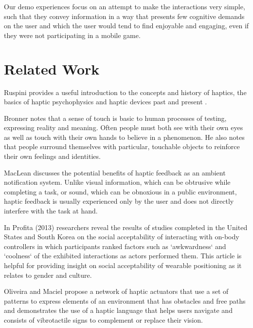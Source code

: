 \documentclass{chi-ext}
\begin{document}
Our demo experiences focus on an attempt to make the interactions very simple, such that they convey information in a way that presents few cognitive demands on the user and which the user would tend to find enjoyable and engaging, even if they were not participating in a mobile game. 

\section{Related Work}

Ruspini provides a useful introduction to the concepts and history of haptics, the basics of haptic psychophysics and haptic devices past and present \cite{ruspini1999haptics}.

Bronner notes that a sense of touch is basic to human processes of testing, expressing reality and meaning. Often people must both see with their own eyes as well as touch with their own hands to believe in a phenomenon\cite{bronner1982haptic}. He also notes that people surround themselves with particular, touchable objects to reinforce their own feelings and identities. 

MacLean \cite{maclean2009putting} discusses the potential benefits of haptic feedback as an ambient notification system. Unlike visual information, which can be obtrusive while completing a task, or sound, which can be obnoxious in a public environment, haptic feedback is usually experienced only by the user and does not directly interfere with the task at hand. 

In Profita (2013) \cite{profita2013don} researchers reveal the results of studies completed in the United States and South Korea on the social acceptability of interacting with on-body controllers in which participants  ranked factors such as `awkwardness` and `coolness` of the exhibited interactions as actors performed them. This article is helpful for providing insight on social acceptability of wearable positioning as it relates to gender and culture.

Oliveira and Maciel propose a network of haptic actuators that use a set of patterns to express elements of an environment that has obstacles and free paths and demonstrates the use of a haptic language that helps users navigate and consists of vibrotactile signs to complement or replace their vision. \cite{Jesus-Oliveira:2013aa}
\end{document}
